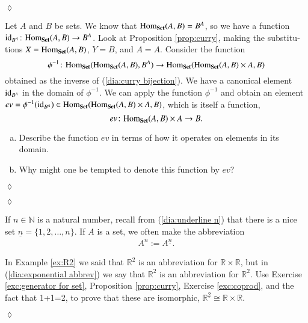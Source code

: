 \documentclass[a4paper]{book}
\def\tn{\textnormal}
\def\RR{{\mathbb R}}
\def\NN{{\mathbb N}}
\def\Hom{\tn{Hom}}
\def\to{\rightarrow}
\def\taking{\colon}
\def\iso{\cong}
\def\m1{{-1}}
\def\ul{\underline}
\def\id{\tn{id}}
\def\Set{{\bf Set}}
\theoremstyle{myth}
\newtheorem{excENG}[envENG]{\begin{english}Exercise\end{english}}
\newenvironment{exerciseENG}{\begin{excENG}}{\hspace*{\fill}$\lozenge$\end{excENG}}
\newtheorem{excRUS}[envRUS]{\begin{russian}Упражнение\end{russian}}
\newenvironment{exerciseRUS}{\begin{excRUS}}{\hspace*{\fill}$\lozenge$\end{excRUS}}
\def\sexc{\begin{enumerate}[a.)]\setlength{\itemsep}{.1cm}\setlength{\parskip}{.1cm}\item}
\def\next{\item}
\def\endsexc{\end{enumerate}}
\begin{document}
\begin{english}
\begin{exerciseRUS}
\begin{russian} \end{russian}
\end{exerciseRUS}

\begin{exerciseENG}\label{exc:evaluation}
Let $A$ and $B$ be sets. We know that $\Hom_\Set(A,B)=B^A$, so we have a function $\id_{B^A}\taking\Hom_\Set(A,B)\to B^A$. Look at Proposition \ref{prop:curry}, making the substitutions $X=\Hom_\Set(A,B)$, $Y=B$, and  $A=A$. Consider the function $$\phi^\m1\taking\Hom_\Set(\Hom_\Set(A,B),B^A)\to\Hom_\Set(\Hom_\Set(A,B)\times A,B)$$ obtained as the inverse of (\ref{dia:curry bijection}). We have a canonical element $\id_{B^A}$ in the domain of $\phi^\m1$. We can apply the function $\phi^\m1$ and obtain an element $ev=\phi^\m1(\id_{B^A})\in\Hom_\Set(\Hom_\Set(A,B)\times A,B)$, which is itself a function, $$ev\taking\Hom_\Set(A,B)\times A\to B.$$ 
\sexc Describe the function $ev$ in terms of how it operates on elements in its domain. 
\next Why might one be tempted to denote this function by $ev$?
\endsexc
\end{exerciseENG}

\begin{exerciseRUS}\label{exc:evaluation}
\begin{russian} \end{russian}
\end{exerciseRUS}

If $n\in\NN$ is a natural number, recall from (\ref{dia:underline n}) that there is a nice set $\ul{n}=\{1,2,\ldots,n\}$. If $A$ is a set, we often make the abbreviation 
\begin{align}\label{dia:exponential abbrev}
A^n:=A^{\ul{n}}.
\end{align}

\begin{russian} \end{russian}

\begin{exerciseENG}\label{exc:two R2s}
In Example \ref{ex:R2} we said that $\RR^2$ is an abbreviation for $\RR\times\RR$, but in (\ref{dia:exponential abbrev}) we say that $\RR^2$ is an abbreviation for $\RR^{\ul{2}}$. Use Exercise \ref{exc:generator for set}, Proposition \ref{prop:curry}, Exercise \ref{exc:coprod}, and the fact that 1+1=2, to prove that these are isomorphic, $\RR^{\ul{2}}\iso\RR\times\RR$.


\end{exerciseENG}
\end{english}
\end{document}
